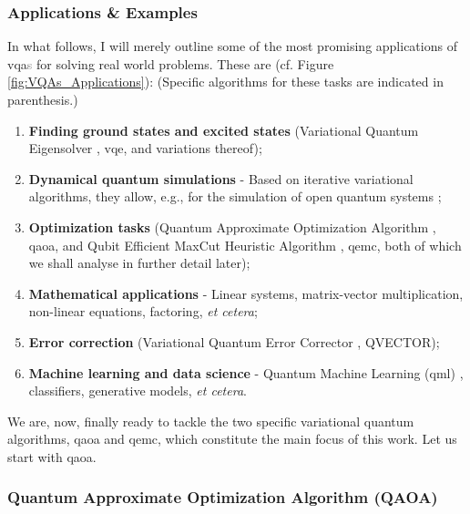 \subsubsection*{\small Applications \& Examples}
In what follows, I will merely outline some of the most promising applications of \acrshort{vqa}\textcolor{gray}{s} for solving real world problems. These are (cf. Figure \ref{fig:VQAs_Applications}): (Specific algorithms for these tasks are indicated in parenthesis.)
\begin{enumerate}
    \item \textbf{Finding ground states and excited states} (Variational Quantum Eigensolver \cite{Peruzzo_2014}, \acrshort{vqe}, and variations thereof);
    \item  \textbf{Dynamical quantum simulations} - Based on iterative variational algorithms, they allow, e.g., for the simulation of open quantum systems \cite{Cerezo_2021};
    \item \textbf{Optimization tasks} (Quantum Approximate Optimization Algorithm \cite{farhi2014quantum}, \acrshort{qaoa}, and Qubit Efficient MaxCut Heuristic Algorithm \cite{tenecohen2023variational}, \acrshort{qemc}, both of which we shall analyse in further detail later);
    \item \textbf{Mathematical applications} \cite{Cerezo_2021} - Linear systems, matrix-vector multiplication, non-linear equations, factoring, \textit{et cetera};
    \item \textbf{Error correction} (Variational Quantum Error Corrector \cite{johnson2017qvector}, QVECTOR);
    \item \textbf{Machine learning and data science} - Quantum Machine Learning (\acrshort{qml}) \cite{Cerezo2022_QML}, classifiers, generative models, \textit{et cetera}.
\end{enumerate}

We are, now, finally ready to tackle the two specific variational quantum algorithms, \acrshort{qaoa} and \acrshort{qemc}, which constitute the main focus of this work. Let us start with \acrshort{qaoa}.

\subsubsection{Quantum Approximate Optimization Algorithm (QAOA)}
\label{subsubsection:QAOA}


